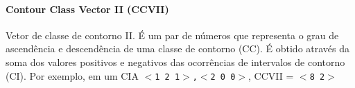 \documentclass[12pt,brazil]{book}
\begin{document}
\paragraph{Contour Class Vector II (CCVII)}
\label{sec:contour-class-vector-2}

Vetor de classe de contorno II. É um par de números que representa o
grau de ascendência e descendência de uma classe de contorno (CC). É
obtido através da soma dos valores positivos e negativos das
ocorrências de intervalos de contorno (CI). Por exemplo, em um CIA
\texttt{$<$1 2 1$>$,$<$2 0 0$>$}, CCVII = \texttt{$<$8 2$>$}
\end{document}

